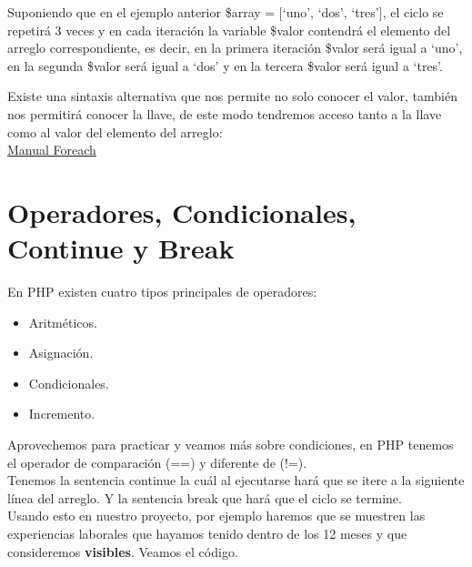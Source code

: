 \documentclass{article}
\begin{document}
Suponiendo que en el ejemplo anterior \$array = $[$‘uno’, ‘dos’, ‘tres’$]$, el ciclo
se repetirá 3 veces y en cada iteración la variable \$valor contendrá el
elemento del arreglo correspondiente, es decir, en la primera iteración \$valor
será igual a ‘uno’, en la segunda \$valor será igual a ‘dos’ y en la tercera
\$valor será igual a ‘tres’.

Existe una sintaxis alternativa que nos permite no solo conocer el valor,
también nos permitirá conocer la llave, de este modo tendremos acceso tanto a
la llave como al valor del elemento del arreglo:\\

\href{http://php.net/manual/es/control-structures.foreach.php}{Manual Foreach}


\section{Operadores, Condicionales, Continue y Break}%
En PHP existen cuatro tipos principales de operadores:

\begin{itemize}
  \item Aritméticos.
  \item Asignación.
  \item Condicionales.
  \item Incremento.
\end{itemize}

Aprovechemos para practicar y veamos más sobre condiciones, en PHP tenemos el
operador de comparación (==) y diferente de (!=).\\

Tenemos la sentencia continue la cuál al ejecutarse hará que se itere a la
siguiente línea del arreglo. Y la sentencia break que hará que el ciclo se
termine.\\

Usando esto en nuestro proyecto, por ejemplo haremos que se muestren las
experiencias laborales que hayamos tenido dentro de los 12 meses y que
consideremos \textbf{visibles}. Veamos el código.\\
\end{document}
